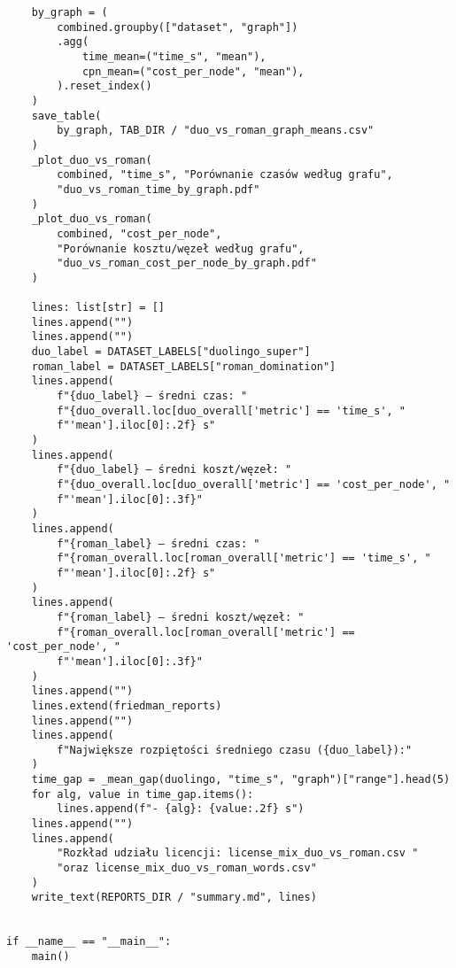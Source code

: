 {\begin{verbatim}
    by_graph = (
        combined.groupby(["dataset", "graph"])
        .agg(
            time_mean=("time_s", "mean"),
            cpn_mean=("cost_per_node", "mean"),
        ).reset_index()
    )
    save_table(
        by_graph, TAB_DIR / "duo_vs_roman_graph_means.csv"
    )
    _plot_duo_vs_roman(
        combined, "time_s", "Porównanie czasów według grafu",
        "duo_vs_roman_time_by_graph.pdf"
    )
    _plot_duo_vs_roman(
        combined, "cost_per_node",
        "Porównanie kosztu/węzeł według grafu",
        "duo_vs_roman_cost_per_node_by_graph.pdf"
    )

    lines: list[str] = []
    lines.append("")
    lines.append("")
    duo_label = DATASET_LABELS["duolingo_super"]
    roman_label = DATASET_LABELS["roman_domination"]
    lines.append(
        f"{duo_label} – średni czas: "
        f"{duo_overall.loc[duo_overall['metric'] == 'time_s', "
        f"'mean'].iloc[0]:.2f} s"
    )
    lines.append(
        f"{duo_label} – średni koszt/węzeł: "
        f"{duo_overall.loc[duo_overall['metric'] == 'cost_per_node', "
        f"'mean'].iloc[0]:.3f}"
    )
    lines.append(
        f"{roman_label} – średni czas: "
        f"{roman_overall.loc[roman_overall['metric'] == 'time_s', "
        f"'mean'].iloc[0]:.2f} s"
    )
    lines.append(
        f"{roman_label} – średni koszt/węzeł: "
        f"{roman_overall.loc[roman_overall['metric'] == 'cost_per_node', "
        f"'mean'].iloc[0]:.3f}"
    )
    lines.append("")
    lines.extend(friedman_reports)
    lines.append("")
    lines.append(
        f"Największe rozpiętości średniego czasu ({duo_label}):"
    )
    time_gap = _mean_gap(duolingo, "time_s", "graph")["range"].head(5)
    for alg, value in time_gap.items():
        lines.append(f"- {alg}: {value:.2f} s")
    lines.append("")
    lines.append(
        "Rozkład udziału licencji: license_mix_duo_vs_roman.csv "
        "oraz license_mix_duo_vs_roman_words.csv"
    )
    write_text(REPORTS_DIR / "summary.md", lines)


if __name__ == "__main__":
    main()
\end{verbatim}
    }
